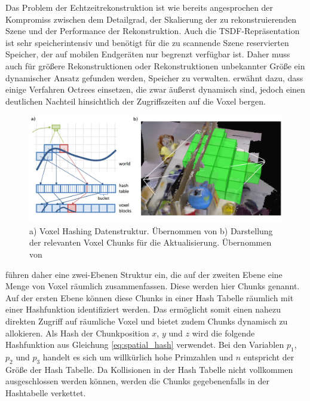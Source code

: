 Das Problem der Echtzeitrekonstruktion ist wie bereits angesprochen der Kompromiss zwischen dem Detailgrad, der Skalierung der zu rekonstruierenden Szene und der Performance der Rekonstruktion. Auch die TSDF-Repräsentation ist sehr speicherintensiv und benötigt für die zu scannende Szene reservierten Speicher, der auf mobilen Endgeräten nur begrenzt verfügbar ist. Daher muss auch für größere Rekonstruktionen oder Rekonstruktionen unbekannter Größe ein dynamischer Ansatz gefunden werden, Speicher zu verwalten. \citet{Klingensmith_2015_7924} erwähnt dazu, dass einige Verfahren Octrees einsetzen, die zwar äußerst dynamisch sind, jedoch einen deutlichen Nachteil hinsichtlich der Zugriffszeiten auf die Voxel bergen. 

\begin{figure}[h]
  \centering
	\includegraphics[width=1.0\textwidth]{content/images/methods/hashing.png} 
  \caption{a) Voxel Hashing Datenstruktur. Übernommen von \citet{niessner2013real} b) Darstellung der relevanten Voxel Chunks für die Aktualisierung. Übernommen von \citet{Klingensmith_2015_7924}}
  \label{fig:hashing}
\end{figure}

\citet{niessner2013real} führen daher eine zwei-Ebenen Struktur ein, die auf der zweiten Ebene eine Menge von Voxel räumlich zusammenfassen. Diese werden hier Chunks genannt. Auf der ersten Ebene können diese Chunks in einer Hash Tabelle räumlich mit einer Hashfunktion identifiziert werden. Das ermöglicht somit einen nahezu direkten Zugriff auf räumliche Voxel und bietet zudem Chunks dynamisch zu allokieren. Als Hash der Chunkposition \(x\), \(y\) und \(z\) wird die folgende Hashfunktion aus Gleichung \ref{eq:spatial_hash} verwendet. Bei den Variablen \(p_1\), \(p_2\) und \(p_3\) handelt es sich um willkürlich hohe Primzahlen und \(n\) entspricht der Größe der Hash Tabelle. Da Kollisionen in der Hash Tabelle nicht vollkommen ausgeschlossen werden können, werden die Chunks gegebenenfalls in der Hashtabelle verkettet.

